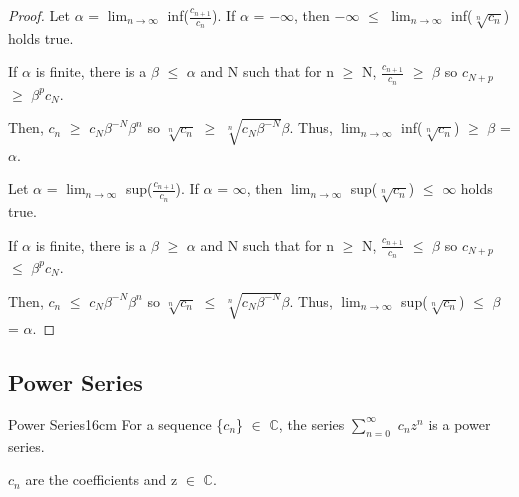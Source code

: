     \begin{proof}
        Let $\alpha$ = $\lim_{n \rightarrow \infty}$ inf($\frac{c_{n+1}}{c_n}$).
        If $\alpha$ = $-\infty$, then $-\infty$ $\leq$
        $\lim_{n \rightarrow \infty}$ inf($\sqrt[n]{c_n}$) holds true.

        If $\alpha$ is finite, there is a $\beta$ $\leq$ $\alpha$ and N such that
        for n $\geq$ N, $\frac{c_{n+1}}{c_n}$ $\geq$ $\beta$
        so $c_{N+p}$ $\geq$ $\beta^p c_N$.

        Then, $c_{n}$ $\geq$ $c_N \beta^{-N} \beta^n$ so
        $\sqrt[n]{c_{n}}$ $\geq$ $\sqrt[n]{c_N \beta^{-N}} \beta$.
        Thus, $\lim_{n \rightarrow \infty}$ inf($\sqrt[n]{c_n}$)
        $\geq$ $\beta$ = $\alpha$.

        \vspace{0.2cm}

        Let $\alpha$ = $\lim_{n \rightarrow \infty}$ sup($\frac{c_{n+1}}{c_n}$).
        If $\alpha$ = $\infty$, then
        $\lim_{n \rightarrow \infty}$ sup($\sqrt[n]{c_n}$)
        $\leq$ $\infty$ holds true.

        If $\alpha$ is finite, there is a $\beta$ $\geq$ $\alpha$ and N such that
        for n $\geq$ N, $\frac{c_{n+1}}{c_n}$ $\leq$ $\beta$
        so $c_{N+p}$ $\leq$ $\beta^p c_N$.

        Then, $c_{n}$ $\leq$ $c_N \beta^{-N} \beta^n$ so
        $\sqrt[n]{c_{n}}$ $\leq$ $\sqrt[n]{c_N \beta^{-N}} \beta$.
        Thus, $\lim_{n \rightarrow \infty}$ sup($\sqrt[n]{c_n}$)
        $\leq$ $\beta$ = $\alpha$.
    \end{proof}

    \newpage





\subsection{ Power Series }

    \begin{definition}{Power Series}{16cm}
        For a sequence \{$c_n$\} $\in$ $\mathbb{C}$, the series
        $\sum_{n=0}^{\infty}$ $c_n z^n$
        is a {\color{lblue} power series}.

        $c_n$ are the coefficients and z $\in$ $\mathbb{C}$.
    \end{definition}

    \vspace{0.5cm}



